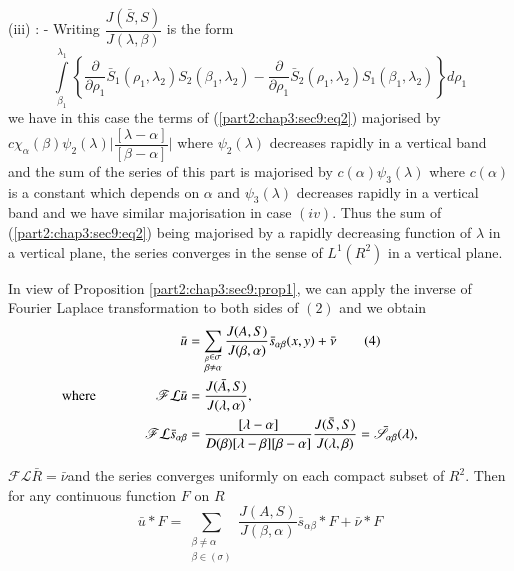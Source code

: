 (iii) : - Writing $\dfrac{J (\bar{S}, S)}{J (\lambda, \beta)}$ is the form
$$
\int\limits^{\lambda_1}_{\beta_1} \left\{ \frac{\partial}{\partial
  \rho_1} \bar{S}_1 (\rho_1,\lambda_2) S_2 (\beta_1,\lambda_2) -
\frac{\partial}{\partial \rho_1} \bar{S}_2 (\rho_1, \lambda_2) S_1
(\beta_1, \lambda_2)\right\} d \rho_1 
$$
we have in this case the terms of (\ref{part2:chap3:sec9:eq2}) majorised by  $c \chi_\alpha
(\beta) \psi_2 (\lambda) \big|\dfrac{[\lambda -\alpha]} {[\beta -
    \alpha]}\big|$ where $\psi_2 (\lambda)$ decreases rapidly in a
vertical band and the sum of the series of this part is majorised by
$c (\alpha) \psi_3 (\lambda)$ where $c (\alpha)$ is a constant which
depends on $\alpha$ and $\psi_3 (\lambda)$ decreases rapidly in a
vertical band and we have similar majorisation in case $(iv)$. Thus
the sum of (\ref{part2:chap3:sec9:eq2}) being majorised by a rapidly
decreasing function of 
$\lambda$ in a vertical plane, the series converges in the sense of
$L^1 (R^2)$ in a vertical plane.  

In view of Proposition \ref{part2:chap3:sec9:prop1}, we can apply the inverse of Fourier
Laplace transformation to both sides of $(2)$ and we obtain 
\begin{align*}
  \bar{u} & = \sum_{\substack{_\beta \in \sigma\\\beta \neq
      \alpha}} \frac{J(A,S)}{J (\beta, \alpha)} \bar{s}_{\alpha \beta}
  (x,y) + \bar{\nu} \tag{4}\label{part2:chap3:sec9:eq4}\\ 
  \text{where}\hspace{1.5cm} \mathscr{F} \mathcal{L} \bar{u} & =
  \dfrac{J (\bar{A},S)}{J (\lambda, \alpha)},\\ 
  \mathscr{F} \mathcal{L} \bar{s}_{\alpha \beta} & = \frac{[\lambda -
      \alpha]}{D (\beta) [\lambda-\beta] [\beta-\alpha]} \frac{J
    (\bar{S}, S)}{J (\lambda, \beta)} = \bar{\mathscr{S}}_{\alpha \beta}
  (\lambda),\hspace{1cm}
\end{align*}

$\mathscr{F} \mathcal{L} \bar{R} = \bar{\nu}$\pageoriginale and the series converges
uniformly on each compact subset of $R^2$. Then for any continuous
function $F$ on $R$ 
\begin{equation}
  \bar{u} * F = \sum_{\substack{\beta \neq \alpha \\ \beta \in
      (\sigma)}} \frac{J (A,S)}{J (\beta, \alpha)} \bar{s}_{\alpha
    \beta} * F + \bar{\nu} * F \tag{5}\label{part2:chap3:sec9:eq5} 
\end{equation}

